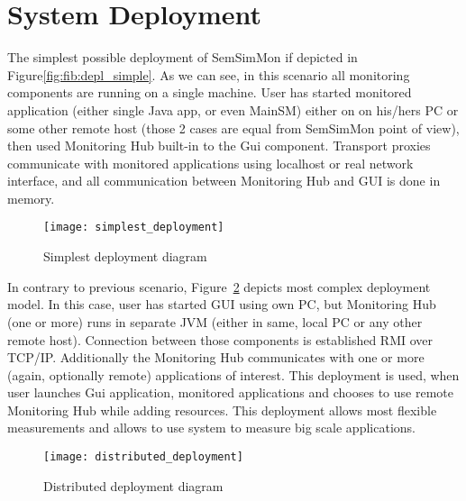%


\section{System Deployment}
\label{sec:deployments}

The simplest possible deployment of SemSimMon if depicted in Figure\ref{fig:fib:depl_simple}. As we can see, in this scenario all monitoring components are running on a single machine. User has started monitored application (either single Java app, or even MainSM) either on on his/hers PC or some other remote host (those 2 cases are equal from SemSimMon point of view), then used Monitoring Hub built-in to the Gui component. Transport proxies communicate with monitored applications using localhost or real network interface, and all communication between Monitoring Hub and GUI is done in memory.

\begin{figure}[h]
   \centering
   \texttt{[image: simplest\_deployment]}
   \caption{Simplest deployment diagram}
   \label{fib:depl_simple}
 \end{figure}
 
In contrary to previous scenario, Figure~\ref{fig:depl_complex} depicts most complex deployment model. In this case, user has started GUI using own PC, but Monitoring Hub (one or more) runs in separate JVM (either in same, local PC or any other remote host). Connection between those components is established RMI over TCP/IP. Additionally the Monitoring Hub communicates with one or more (again, optionally remote) applications of interest. This deployment is used, when user launches Gui application, monitored applications and chooses to use remote Monitoring Hub while adding resources. This deployment allows most flexible measurements and allows to use system to measure big scale applications.

\begin{figure}[h]
   \centering
   \texttt{[image: distributed\_deployment]}
   \caption{Distributed deployment diagram}
   \label{fig:depl_complex}
 \end{figure}

